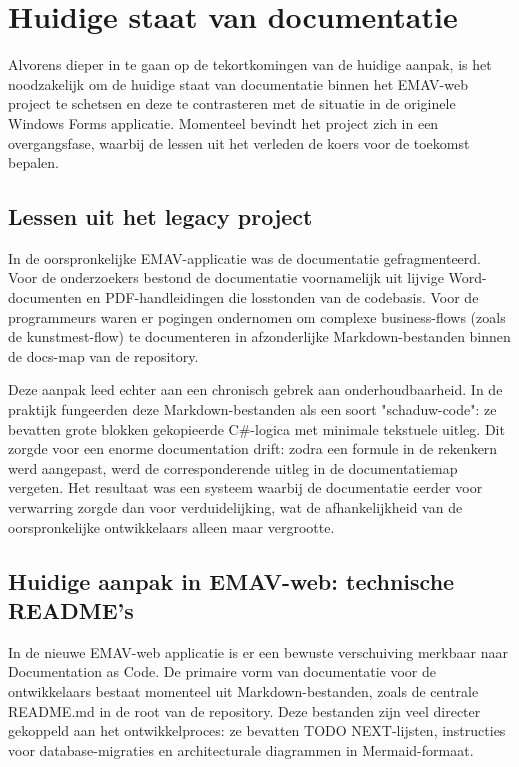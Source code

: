 \chapter{Huidige staat van documentatie}
\label{ch:huidige_staat_documentatie}

Alvorens dieper in te gaan op de tekortkomingen van de huidige aanpak, is het noodzakelijk om de huidige staat van documentatie binnen het EMAV-web project te schetsen en deze te contrasteren met de situatie in de originele Windows Forms applicatie. Momenteel bevindt het project zich in een overgangsfase, waarbij de lessen uit het verleden de koers voor de toekomst bepalen.

\section{Lessen uit het legacy project}
{\sloppy In de oorspronkelijke EMAV-applicatie was de documentatie gefragmenteerd. Voor de onderzoekers bestond de documentatie voornamelijk uit lijvige Word-documenten en PDF-handleidingen die losstonden van de codebasis. Voor de programmeurs waren er pogingen ondernomen om complexe business-flows (zoals de kunstmest-flow) te documenteren in afzonderlijke Markdown-bestanden binnen de docs-map van de repository.\par}

Deze aanpak leed echter aan een chronisch gebrek aan onderhoudbaarheid. In de praktijk fungeerden deze Markdown-bestanden als een soort "schaduw-code": ze bevatten grote blokken gekopieerde C\#-logica met minimale tekstuele uitleg. Dit zorgde voor een enorme documentation drift: zodra een formule in de rekenkern werd aangepast, werd de corresponderende uitleg in de documentatiemap vergeten. Het resultaat was een systeem waarbij de documentatie eerder voor verwarring zorgde dan voor verduidelijking, wat de afhankelijkheid van de oorspronkelijke ontwikkelaars alleen maar vergrootte.

\section{Huidige aanpak in EMAV-web: technische README's}
In de nieuwe EMAV-web applicatie is er een bewuste verschuiving merkbaar naar Documentation as Code. De primaire vorm van documentatie voor de ontwikkelaars bestaat momenteel uit Markdown-bestanden, zoals de centrale README.md in de root van de repository. Deze bestanden zijn veel directer gekoppeld aan het ontwikkelproces: ze bevatten TODO NEXT-lijsten, instructies voor database-migraties en architecturale diagrammen in Mermaid-formaat.

